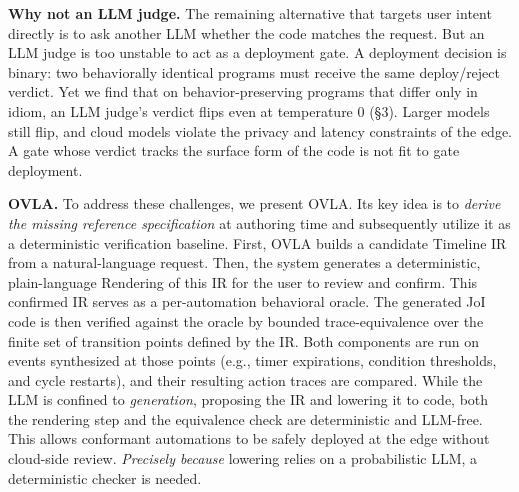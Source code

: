 \documentclass[sigconf,nonacm,anonymous,review]{acmart}
\begin{document}
\textbf{Why not an LLM judge.} The remaining alternative that targets user intent directly is to ask another LLM whether the code matches the request. But an LLM judge is too unstable to act as a deployment gate. A deployment decision is binary: two behaviorally identical programs must receive the same deploy/reject verdict. Yet we find that on behavior-preserving programs that differ only in idiom, an LLM judge's verdict flips even at temperature 0 (\S3). Larger models still flip, and cloud models violate the privacy and latency constraints of the edge. A gate whose verdict tracks the surface form of the code is not fit to gate deployment.

\textbf{OVLA.} To address these challenges, we present OVLA. Its key idea is to \emph{derive the missing reference specification} at authoring time and subsequently utilize it as a deterministic verification baseline. %
First, OVLA builds a candidate Timeline IR from a natural-language request. Then, the system generates a deterministic, plain-language Rendering of this IR for the user to review and confirm. %
This confirmed IR serves as a per-automation behavioral oracle. The generated JoI code is then verified against the oracle by bounded trace-equivalence over the finite set of transition points defined by the IR. Both components are run on events synthesized at those points (e.g., timer expirations, condition thresholds, and cycle restarts), and their resulting action traces are compared. While the LLM is confined to \emph{generation}, proposing the IR and lowering it to code, both the rendering step and the equivalence check are deterministic and LLM-free. This allows conformant automations to be safely deployed at the edge without cloud-side review. \emph{Precisely because} lowering relies on a probabilistic LLM, %
a deterministic checker is needed.
\end{document}
